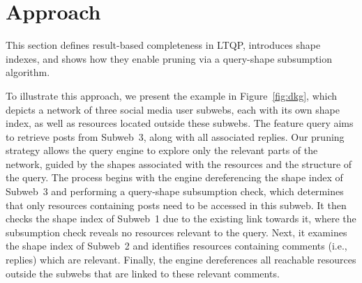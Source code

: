 

\section{Approach}\label{sec:approach}

This section defines result-based completeness in \ac{LTQP}, introduces shape indexes, and shows how they enable pruning via a query-shape subsumption algorithm.

To illustrate this approach, we present the example in Figure~\ref{fig:dkg}, which depicts a network of three social media user subwebs, each with its own shape index, as well as resources located outside these subwebs.
The feature query aims to retrieve posts from Subweb~3, along with all associated replies.
Our pruning strategy allows the query engine to explore only the relevant parts of the network, guided by the shapes associated with the resources and the structure of the query.
The process begins with the engine dereferencing the shape index of Subweb~3 and performing a query-shape subsumption check, which determines that only resources containing posts need to be accessed in this subweb.
It then checks the shape index of Subweb~1 due to the existing link towards it, where the subsumption check reveals no resources relevant to the query.
Next, it examines the shape index of Subweb~2 and identifies resources containing comments (i.e., replies) which are relevant.
Finally, the engine dereferences all reachable resources outside the subwebs that are linked to these relevant comments.

